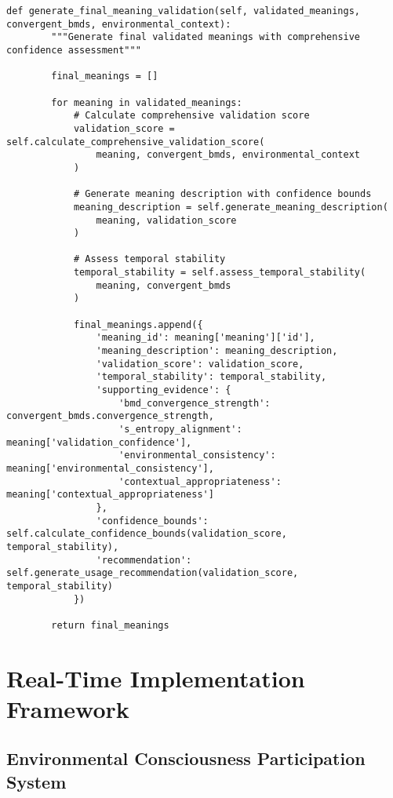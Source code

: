 \documentclass[12pt,a4paper]{article}
\begin{document}
\begin{lstlisting}[style=pythonstyle, caption=Environmental Meaning Extraction]
    def generate_final_meaning_validation(self, validated_meanings, convergent_bmds, environmental_context):
        """Generate final validated meanings with comprehensive confidence assessment"""
        
        final_meanings = []
        
        for meaning in validated_meanings:
            # Calculate comprehensive validation score
            validation_score = self.calculate_comprehensive_validation_score(
                meaning, convergent_bmds, environmental_context
            )
            
            # Generate meaning description with confidence bounds
            meaning_description = self.generate_meaning_description(
                meaning, validation_score
            )
            
            # Assess temporal stability
            temporal_stability = self.assess_temporal_stability(
                meaning, convergent_bmds
            )
            
            final_meanings.append({
                'meaning_id': meaning['meaning']['id'],
                'meaning_description': meaning_description,
                'validation_score': validation_score,
                'temporal_stability': temporal_stability,
                'supporting_evidence': {
                    'bmd_convergence_strength': convergent_bmds.convergence_strength,
                    's_entropy_alignment': meaning['validation_confidence'],
                    'environmental_consistency': meaning['environmental_consistency'],
                    'contextual_appropriateness': meaning['contextual_appropriateness']
                },
                'confidence_bounds': self.calculate_confidence_bounds(validation_score, temporal_stability),
                'recommendation': self.generate_usage_recommendation(validation_score, temporal_stability)
            })
        
        return final_meanings
\end{lstlisting}

\section{Real-Time Implementation Framework}

\subsection{Environmental Consciousness Participation System}
\end{document}
